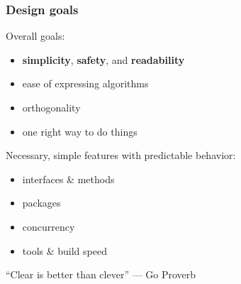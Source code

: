 \documentclass[handout,compress,t,11pt]{beamer}
\begin{document}
\begin{frame}
    \frametitle{Design goals}
    Overall goals:
    \vspace{-0.2\baselineskip}
    \begin{itemize}
        \item \alert{\bf simplicity}, {\bf safety}, and {\bf readability}
        \item ease of expressing algorithms
        \item orthogonality
        \item one right way to do things
    \end{itemize}
    \vspace{1\baselineskip}
    Necessary, simple features with predictable behavior:
    \vspace{-0.2\baselineskip}
    \begin{itemize}
        \item interfaces \& methods
        \item packages
        \item concurrency
        \item tools \& build speed
    \end{itemize}
    \par \vspace{1.2\baselineskip}
    ``Clear is better than clever'' --- Go Proverb
\end{frame}

\end{document}

